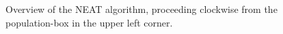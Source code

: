 \begin{figure}[htb]
\begin{mdframed}
\begin{tikzpicture}
    \end{tikzpicture}
    \end{mdframed}
    \caption{Overview of the NEAT algorithm, proceeding clockwise from the population-box in
    the upper left corner.}
\end{figure}